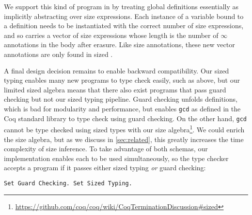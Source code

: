 We support this kind of program in \lang by treating global definitions essentially as implicitly abstracting over size expressions.
Each instance of a variable bound to a definition needs to be instantiated with the correct number of size expressions, and so carries a vector of size expressions whose length is the number of $\infty$ annotations in the body after erasure.
Like size annotations, these new vector annotations are only found in sized \lang.

A final design decision remains to enable backward compatibility.
Our sized typing enables many new programs to type check easily, such as  above, but our limited sized algebra means that there also exist programs that pass guard checking but not our sized typing pipeline.
Guard checking unfolds definitions, which is bad for modularity and performance, but enables \texttt{gcd} as defined in the Coq standard library to type check using guard checking.
On the other hand, \texttt{gcd} cannot be type checked using sized types with our size algebra\footnote{\url{https://github.com/coq/coq/wiki/CoqTerminationDiscussion\#sized}}.
We could enrich the size algebra, but as we discuss in \autoref{sec:related}, this greatly increases the time complexity of size inference.
To take advantage of both schemas, our implementation enables each to be used simultaneously, so the type checker accepts a program if it passes either sized typing \textit{or} guard checking:

\begin{verbatim}
Set Guard Checking. Set Sized Typing.
\end{verbatim}

